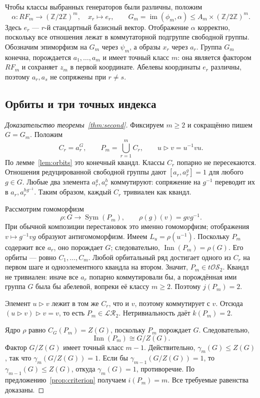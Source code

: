 \documentclass[11pt,a4paper]{article}
\theoremstyle{definition}
\theoremstyle{remark}
\newcommand{\LR}{\mathcal{LR}}
\newcommand{\tOS}{t\mathcal{OS}}
\newcommand{\Inn}{\operatorname{Inn}}
\newcommand{\Z}{\mathbb Z}
\newcommand{\conj}{\triangleright}
\begin{document}
Чтобы классы выбранных генераторов были различны,
положим
\[
 \alpha:RF_m\to(\Z/2\Z)^m,\quad x_r\mapsto e_r,\qquad
 G_m=\operatorname{im}(\phi_m,\alpha)
 \le A_m\times(\Z/2\Z)^m.
\]
Здесь \(e_r\) --- \(r\)-й стандартный базисный вектор.
Отображение \(\alpha\) корректно, поскольку все отношения
лежат в коммутаторной подгруппе свободной группы.
Обозначим эпиморфизм на \(G_m\) через \(\psi_m\),
а образы \(x_r\) через \(a_r\).
Группа \(G_m\) конечна, порождается \(a_1,\ldots,a_m\)
и имеет точный класс \(m\):
она является фактором \(RF_m\) и сохраняет \(z_m\)
в первой координате.
Абелевы координаты \(e_r\) различны, поэтому
\(a_r,a_s\) не сопряжены при \(r\ne s\).

\subsection{Орбиты и три точных индекса}

\begin{proof}[Доказательство теоремы~\ref{thm:second}]
Фиксируем \(m\ge2\) и сокращённо пишем \(G=G_m\).
Положим
\[
 C_r=a_r^G,\qquad P_m=\bigcup_{r=1}^{m}C_r,\qquad
 u\conj v=u^{-1}vu.
\]
По лемме~\ref{lem:orbits} это конечный квандл.
Классы \(C_r\) попарно не пересекаются.
Отношения редуцированной свободной группы дают
\([a_r,a_r^g]=1\) для любого \(g\in G\).
Любые два элемента \(a_r^g,a_r^h\) коммутируют:
сопряжение на \(g^{-1}\) переводит их в
\(a_r,a_r^{hg^{-1}}\).
Таким образом, каждый \(C_r\) тривиален как квандл.

Рассмотрим гомоморфизм
\[
 \rho:G\to\operatorname{Sym}(P_m),\qquad
 \rho(g)(v)=gvg^{-1}.
\]
При обычной композиции перестановок это именно гомоморфизм;
отображения \(v\mapsto g^{-1}vg\) образуют антигомоморфизм.
Имеем \(L_u=\rho(u^{-1})\).
Поскольку \(P_m\) содержит все \(a_r\), оно порождает \(G\);
следовательно, \(\Inn(P_m)=\rho(G)\).
Его орбиты --- ровно \(C_1,\ldots,C_m\).
Любой орбитальный ряд достигает одного из \(C_r\)
на первом шаге и одноэлементного квандла на втором.
Значит, \(P_m\in\tOS_2\).
Квандл не тривиален: иначе все \(a_r\) попарно коммутировали бы,
а порождённая ими группа \(G\) была бы абелевой,
вопреки её классу \(m\ge2\).
Поэтому \(j(P_m)=2\).

Элемент \(u\conj v\) лежит в том же \(C_r\), что и \(v\),
поэтому коммутирует с \(v\). Отсюда
\((u\conj v)\conj v=v\), то есть \(P_m\in\LR_2\).
Нетривиальность даёт \(k(P_m)=2\).

Ядро \(\rho\) равно \(C_G(P_m)=Z(G)\),
поскольку \(P_m\) порождает \(G\).
Следовательно,
\[
 \Inn(P_m)\cong G/Z(G).
\]
Фактор \(G/Z(G)\) имеет точный класс \(m-1\).
Действительно, \(\gamma_m(G)\le Z(G)\), так что
\(\gamma_m(G/Z(G))=1\).
Если бы \(\gamma_{m-1}(G/Z(G))=1\), то
\(\gamma_{m-1}(G)\le Z(G)\), откуда \(\gamma_m(G)=1\),
противоречие.
По предложению~\ref{prop:criterion} получаем \(i(P_m)=m\).
Все требуемые равенства доказаны.
\end{proof}
\end{document}
